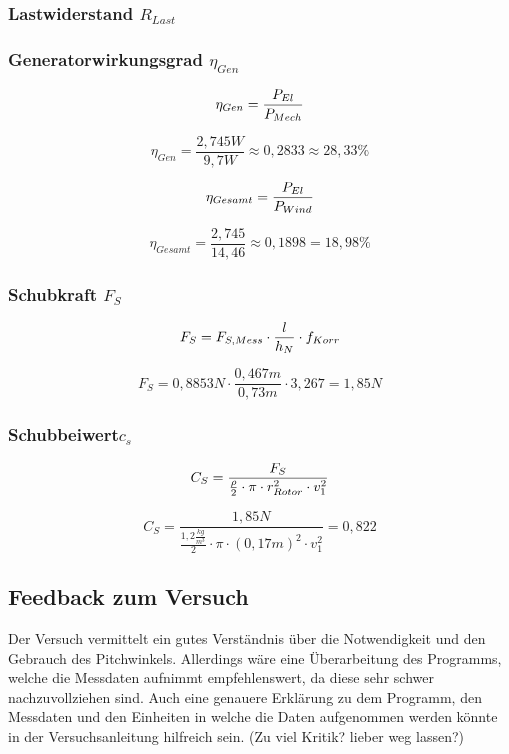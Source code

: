 \subsubsection*{Lastwiderstand $R_{Last}$}
\subsubsection*{Generatorwirkungsgrad $\eta_{Gen}$}
\begin{equation}
    \centering
    \eta_{Gen} = \frac{P_{El}}{P_{Mech}}
    \label{eq:230615_Generatorwirkungsgrad}
\end{equation}

$$\eta_{Gen} = \frac{2,745W}{9,7W} \approx 0,2833 \approx 28,33\% $$

\begin{equation}
    \centering
    \eta_{Gesamt} = \frac{P_{El}}{P_{Wind}}
    \label{eq:230615_Gesamtwirkungsgrad}
\end{equation}

$$\eta_{Gesamt} = \frac{2,745}{14,46}\approx 0,1898 = 18,98\%$$
\subsubsection*{Schubkraft $F_S$}
\begin{equation}
    \centering
    F_S = F_{S,Mess} \cdot \frac{l}{h_N} \cdot f_{Korr}
    \label{eq:230615_Schubkraft}
\end{equation}

$$F_S = 0,8853N \cdot \frac{0,467m}{0,73m} \cdot 3,267 = 1,85N$$
\subsubsection*{Schubbeiwert$c_s$}
\begin{equation}
    \centering
    C_S = \frac{F_S}{\frac{\rho}{2} \cdot \pi \cdot r_{Rotor}^2 \cdot v_1^2}
    \label{eq:230615_Schubbeiwert}
\end{equation}

$$C_S = \frac{1,85N}{\frac{1,2 \frac{kg}{m^3}}{2} \cdot \pi \cdot (0,17 m)^2 \cdot v_1^2} = 0,822$$


\subsection{Feedback zum Versuch}

Der Versuch vermittelt ein gutes Verständnis über die Notwendigkeit und den Gebrauch des Pitchwinkels. Allerdings wäre eine Überarbeitung des Programms, welche die Messdaten aufnimmt 
empfehlenswert, da diese sehr schwer nachzuvollziehen sind. Auch eine genauere Erklärung zu dem Programm, den Messdaten und den Einheiten in welche die Daten aufgenommen werden könnte in der Versuchsanleitung hilfreich sein.
(Zu viel Kritik? lieber weg lassen?)